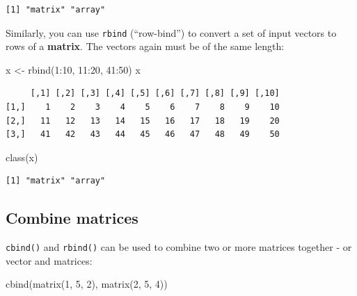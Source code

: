 \documentclass[
]{book}
\newenvironment{Shaded}{\begin{snugshade}}{\end{snugshade}}
\newcommand{\DecValTok}[1]{\textcolor[rgb]{0.00,0.00,0.81}{#1}}
\newcommand{\FunctionTok}[1]{\textcolor[rgb]{0.00,0.00,0.00}{#1}}
\newcommand{\NormalTok}[1]{#1}
\newcommand{\OtherTok}[1]{\textcolor[rgb]{0.56,0.35,0.01}{#1}}
\newcommand{\SpecialCharTok}[1]{\textcolor[rgb]{0.00,0.00,0.00}{#1}}
\begin{document}
\begin{verbatim}
[1] "matrix" "array" 
\end{verbatim}

Similarly, you can use \texttt{rbind} (``row-bind'') to convert a set of input vectors to rows of a \textbf{matrix}. The vectors again must be of the same length:

\begin{Shaded}
\begin{Highlighting}[]
\NormalTok{x }\OtherTok{\textless{}{-}} \FunctionTok{rbind}\NormalTok{(}\DecValTok{1}\SpecialCharTok{:}\DecValTok{10}\NormalTok{, }\DecValTok{11}\SpecialCharTok{:}\DecValTok{20}\NormalTok{, }\DecValTok{41}\SpecialCharTok{:}\DecValTok{50}\NormalTok{)}
\NormalTok{x}
\end{Highlighting}
\end{Shaded}

\begin{verbatim}
     [,1] [,2] [,3] [,4] [,5] [,6] [,7] [,8] [,9] [,10]
[1,]    1    2    3    4    5    6    7    8    9    10
[2,]   11   12   13   14   15   16   17   18   19    20
[3,]   41   42   43   44   45   46   47   48   49    50
\end{verbatim}

\begin{Shaded}
\begin{Highlighting}[]
\FunctionTok{class}\NormalTok{(x)}
\end{Highlighting}
\end{Shaded}

\begin{verbatim}
[1] "matrix" "array" 
\end{verbatim}

\hypertarget{combine-matrices}{%
\subsection{Combine matrices}\label{combine-matrices}}

\texttt{cbind()} and \texttt{rbind()} can be used to combine two or more matrices together - or vector and matrices:

\begin{Shaded}
\begin{Highlighting}[]
\FunctionTok{cbind}\NormalTok{(}\FunctionTok{matrix}\NormalTok{(}\DecValTok{1}\NormalTok{, }\DecValTok{5}\NormalTok{, }\DecValTok{2}\NormalTok{), }\FunctionTok{matrix}\NormalTok{(}\DecValTok{2}\NormalTok{, }\DecValTok{5}\NormalTok{, }\DecValTok{4}\NormalTok{))}
\end{Highlighting}
\end{Shaded}
\end{document}
